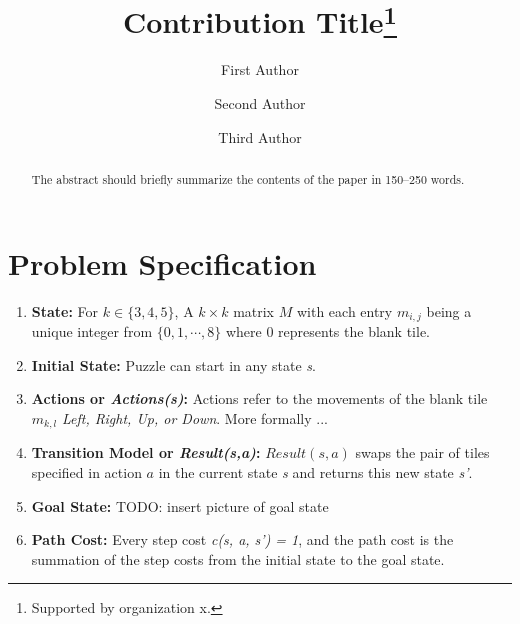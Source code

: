 \documentclass[runningheads]{llncs}
\begin{document}
%
\title{Contribution Title\thanks{Supported by organization x.}}
%
%
\author{First Author \and
Second Author \and
Third Author}
%
%
%
\maketitle              %
%
\begin{abstract}
The abstract should briefly summarize the contents of the paper in
150--250 words.

\end{abstract}
%
%
%
\section{Problem Specification}
\begin{enumerate}
    \item \textbf{State:} For \( k \in \{3, 4, 5\} \),  A \( k \times k \) matrix \( M \) with each entry \( m_{i, j} \) being a unique integer from \( \{0, 1, \cdots, 8 \} \) where 0 represents the blank tile.
    \item \textbf{Initial State:} Puzzle can start in any state \textit{s}.
    \item \textbf{Actions or \textit{Actions(s)}:} Actions refer to the movements of the blank tile \( m_{k, l} \) \textit{Left, Right, Up, or Down}. More formally ...
    \item \textbf{Transition Model or \textit{Result(s,a)}:} \( Result(s, a) \) swaps the pair of tiles specified in action \( a \) in the current state \textit{s} and returns this new state \textit{s'}.
    \item \textbf{Goal State:} TODO: insert picture of goal state
    \item \textbf{Path Cost:} Every step cost \textit{c(s, a, s') = 1}, and the path cost is the summation of the step costs from the initial state to the goal state.
\end{enumerate}
\end{document}
